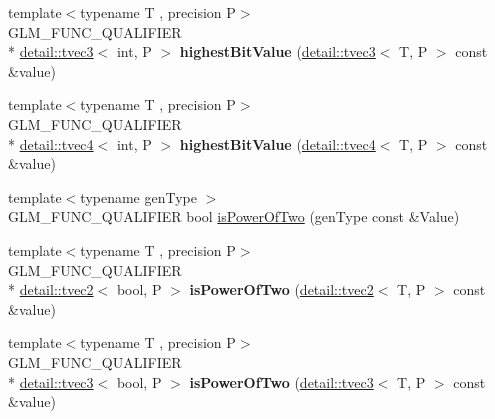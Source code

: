 \begin{DoxyCompactItemize}
\item 
\hypertarget{namespaceglm_a3cc0f5abbbb75eaed77259e59e64c601}{{\footnotesize template$<$typename T , precision P$>$ }\\G\-L\-M\-\_\-\-F\-U\-N\-C\-\_\-\-Q\-U\-A\-L\-I\-F\-I\-E\-R \\*
\hyperlink{structglm_1_1detail_1_1tvec3}{detail\-::tvec3}$<$ int, P $>$ {\bfseries highest\-Bit\-Value} (\hyperlink{structglm_1_1detail_1_1tvec3}{detail\-::tvec3}$<$ T, P $>$ const \&value)}\label{namespaceglm_a3cc0f5abbbb75eaed77259e59e64c601}

\item 
\hypertarget{namespaceglm_a89cb0ee8fe4da392e1b3662512bee20d}{{\footnotesize template$<$typename T , precision P$>$ }\\G\-L\-M\-\_\-\-F\-U\-N\-C\-\_\-\-Q\-U\-A\-L\-I\-F\-I\-E\-R \\*
\hyperlink{structglm_1_1detail_1_1tvec4}{detail\-::tvec4}$<$ int, P $>$ {\bfseries highest\-Bit\-Value} (\hyperlink{structglm_1_1detail_1_1tvec4}{detail\-::tvec4}$<$ T, P $>$ const \&value)}\label{namespaceglm_a89cb0ee8fe4da392e1b3662512bee20d}

\item 
{\footnotesize template$<$typename gen\-Type $>$ }\\G\-L\-M\-\_\-\-F\-U\-N\-C\-\_\-\-Q\-U\-A\-L\-I\-F\-I\-E\-R bool \hyperlink{group__gtx__bit_ga5ddca7546d8be35992eedd3411842545}{is\-Power\-Of\-Two} (gen\-Type const \&Value)
\item 
\hypertarget{namespaceglm_a9a3caa0a27cd099623517846f6ae1d23}{{\footnotesize template$<$typename T , precision P$>$ }\\G\-L\-M\-\_\-\-F\-U\-N\-C\-\_\-\-Q\-U\-A\-L\-I\-F\-I\-E\-R \\*
\hyperlink{structglm_1_1detail_1_1tvec2}{detail\-::tvec2}$<$ bool, P $>$ {\bfseries is\-Power\-Of\-Two} (\hyperlink{structglm_1_1detail_1_1tvec2}{detail\-::tvec2}$<$ T, P $>$ const \&value)}\label{namespaceglm_a9a3caa0a27cd099623517846f6ae1d23}

\item 
\hypertarget{namespaceglm_afd117094f8c3507a5fa6598be1f089c1}{{\footnotesize template$<$typename T , precision P$>$ }\\G\-L\-M\-\_\-\-F\-U\-N\-C\-\_\-\-Q\-U\-A\-L\-I\-F\-I\-E\-R \\*
\hyperlink{structglm_1_1detail_1_1tvec3}{detail\-::tvec3}$<$ bool, P $>$ {\bfseries is\-Power\-Of\-Two} (\hyperlink{structglm_1_1detail_1_1tvec3}{detail\-::tvec3}$<$ T, P $>$ const \&value)}\label{namespaceglm_afd117094f8c3507a5fa6598be1f089c1}


\end{DoxyCompactItemize}
